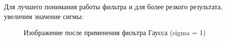 \documentclass[14pt,a4paper,report]{report}
\begin{document}
Для лучшего понимания работы фильтра и для более резкого результата, увеличим значение сигмы:
 
\begin{figure}[h]
\begin{minipage}[h]{0.47\linewidth}
\end{minipage}
\hfill
\begin{minipage}[h]{0.47\linewidth}
\end{minipage}
\caption{Изображение после применения фильтра Гаусса (sigma = 1)}
\label{ris:image1}
\end{figure}
\end{document}
